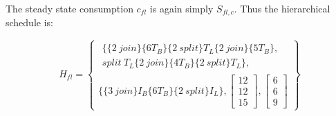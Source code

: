 The steady state consumption $c_{fl}$ is again simply $S_{fl, c}$.
Thus the hierarchical schedule is:

\begin{displaymath}
H_{fl} = \left\{
\begin{array}{l}
\begin{array}{c}\{\{2\ join\} \{6T_B\} \{2\ split\} T_L \{2\ join\} \{5T_B\},\\
split\ T_L \{2\ join\} \{4T_B\} \{2\ split\} T_L\},\end{array}\\
\{\{3\ join\} I_B \{6T_B\} \{2\ split\} I_L\}, \left[
\begin{array}{c}
12\\12\\15
\end{array}\right], \left[
\begin{array}{c}
6\\6\\9
\end{array}\right] \end{array}\right\}
\end{displaymath}

\begin{comment}
Scheduling {\feedbackloops} requires some extra care, as explained
above.  Once again, steady schedule multiplicities are computed,
but this time, the amount of data buffered between the {\joiner},
$body$, {\splitter} and $loop$ is required in order to perform the
algorithm.

The first step in the algorithm is to execute the {\joiner} as many
times as possible, depending on how much data is available between
the $loop$ and the {\joiner}, up to the number permitted in
executing a steady schedule. Data is transferred between buffers
at known rates, and buffering is adjusted appropriately. Next the
$body$ is executed as much as possible, followed by the {\splitter},
followed by the $loop$.  If, after executing this sequence, the
{\joiner}, $body$, {\splitter} or $loop$ need to be executed more
times in order to complete a steady schedule, this execution is
repeated until the steady schedule is completed.

It is possible, that the algorithm above deadlocks - there is not
enough data for any of the children to advance.  This does not
necessarily mean that the {\feedbackloop} has no legal schedule.
This is because pseudo single-appearance scheduling is a coarse
scheduling technique.  Furthermore, this problem is not caused by
hierarchical scheduling.  Figure
\ref{fig:feedback-non-schedulable} contains an example of a
{\feedbackloop} that cannot be scheduled using any single appearance
technique.
\end{comment}
